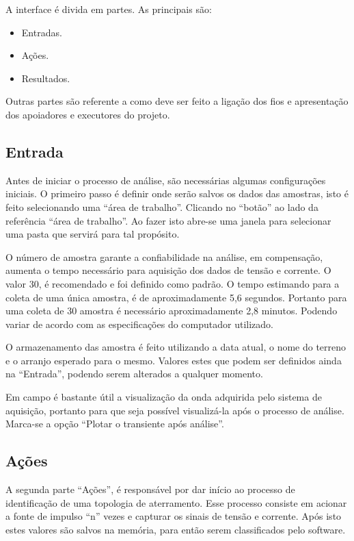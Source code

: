 \documentclass[a4paper, 10pt]{article}
\begin{document}
A interface é divida em partes. As principais são:

\begin{itemize}
    \item Entradas.
    \item Ações.
    \item Resultados.
\end{itemize}

Outras partes são referente a como deve ser feito a ligação dos fios e apresentação dos
apoiadores e executores do projeto.

\subsection{Entrada}

Antes de iniciar o processo de análise, são necessárias algumas configurações
iniciais. O primeiro passo é definir onde serão salvos os dados das amostras, 
isto é feito selecionando uma ``área de trabalho''. 
Clicando no ``botão'' ao lado da referência ``área de trabalho''.
Ao fazer isto abre-se uma janela para selecionar uma pasta que 
servirá para tal propósito.


O número de amostra garante a confiabilidade na análise, em
compensação, aumenta o tempo necessário para aquisição dos dados de tensão e corrente. O valor 30, 
é recomendado e foi definido como padrão. 
O tempo estimando para a coleta de uma única amostra, é de aproximadamente 5,6 segundos. 
Portanto para uma coleta de 30 amostra é necessário aproximadamente 2,8 minutos. Podendo variar de 
acordo com as especificações do computador utilizado.

O armazenamento das amostra é feito utilizando a data atual, o nome do terreno e o arranjo esperado para 
o mesmo. Valores estes que podem ser definidos ainda na ``Entrada'', podendo serem alterados a qualquer
momento. 

Em campo é bastante útil a visualização da onda adquirida pelo sistema de aquisição, portanto para 
que seja possível visualizá-la após o processo de análise. Marca-se a opção ``Plotar o transiente 
após análise''.

\subsection{Ações}

A segunda parte ``Ações'', é responsável por dar início ao processo de identificação de uma topologia
de aterramento. Esse processo consiste em acionar a fonte de impulso ``n'' vezes e capturar 
os sinais de tensão e corrente. Após isto estes valores são salvos na memória, para então serem 
classificados pelo software.
\end{document}
